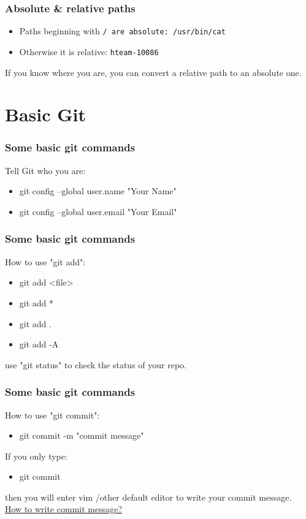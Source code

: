 \documentclass[aspectratio=169]{beamer}
\begin{document}
\begin{frame}
  \frametitle{Absolute \& relative paths}
  \begin{itemize}
    \item Paths beginning with \tt{/} are absolute: \tt{/usr/bin/cat}
    \item Otherwise it is relative: \tt{hteam-10086}
  \end{itemize}

  If you know where you are, you can convert a relative path to an absolute one.
\end{frame}

\section{Basic Git}
\begin{frame}
  \frametitle{Some basic git commands}
  Tell Git who you are:
  \begin{itemize}
    \item git config --global user.name "Your Name"
    \item git config --global user.email "Your Email"
  \end{itemize}
\end{frame}

\begin{frame}
  \frametitle{Some basic git commands}
  How to use "git add":
  \begin{itemize}
    \item git add <file>
    \item git add *
    \item git add .
    \item git add -A
  \end{itemize}
  use "git status" to check the status of your repo.

\end{frame}

\begin{frame}
  \frametitle{Some basic git commands}
  How to use "git commit":
  \begin{itemize}
    \item git commit -m "commit message"
  \end{itemize}
  If you only type: 
  \begin{itemize}
    \item git commit
  \end{itemize}
  then you will enter vim /other default editor to write your commit message.\\
  \href{https://www.conventionalcommits.org/en/v1.0.0/}{How to write commit message?}
\end{frame}
\end{document}
